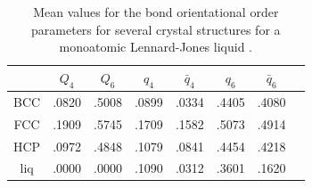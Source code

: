 \begin{table}
	\centering
	\caption[Mean values for the bond orientational order parameters for several crystal structures for a monoatomic Lennard-Jones liquid.]{Mean values for the bond orientational order parameters for several crystal structures for a monoatomic Lennard-Jones liquid \cite{BOP_first,BOP_values}.}
	\label{BOP_values}
	\begin{tabular}{ c c c c c c c c }
		& $Q_4$ & $Q_6$ & $q_4$ & $\bar{q}_4$ & $q_6$ & $\bar{q}_6$ \\
		\hline	
		\hline		
		BCC & .0820 & .5008 & .0899 & .0334 & .4405 & .4080\\
		FCC & .1909 & .5745 & .1709 & .1582 & .5073 & .4914\\
		HCP & .0972 & .4848 & .1079 & .0841 & .4454 & .4218\\
		liq & .0000 & .0000 & .1090 & .0312 & .3601 & .1620\\
		\hline 
	\end{tabular}
\end{table}

